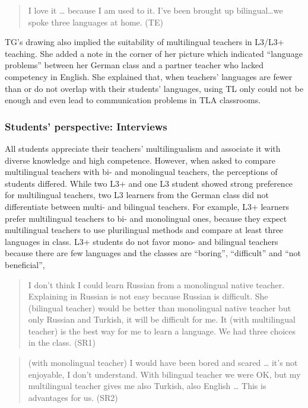 \documentclass[output=paper]{../langscibook}
\begin{document}
\begin{quote}
I love it … because I am used to it. I’ve been brought up bilingual…we spoke three languages at home. (TE) 
\end{quote}

TG’s drawing also implied the suitability of multilingual teachers in L3/L3+ teaching. She added a note in the corner of her picture which indicated “language problems” between her German class and a partner teacher who lacked competency in English. She explained that, when teachers’ languages are fewer than or do not overlap with their students’ languages, using TL only could not be enough and even lead to communication problems in TLA classrooms.


\subsubsection{Students’ perspective: Interviews}
All students appreciate their teachers’ multilingualism and associate it with diverse knowledge and high competence. However, when asked to compare multilingual teachers with bi- and monolingual teachers, the perceptions of students differed. While two L3+ and one L3 student showed strong preference for multilingual teachers, two L3 learners from the German class did not differentiate between multi- and bilingual teachers. For example, L3+ learners prefer multilingual teachers to bi- and monolingual ones, because they expect multilingual teachers to use plurilingual methods and compare at least three languages in class. L3+ students do not favor mono- and bilingual teachers because there are few languages and the classes are “boring”, “difficult” and “not beneficial”, 

\begin{quote}
I don’t think I could learn Russian from a monolingual native teacher. Explaining in Russian is not easy because Russian is difficult. She (bilingual teacher) would be better than monolingual native teacher but only Russian and Turkish, it will be difficult for me. It (with multilingual teacher) is the best way for me to learn a language. We had three choices in the class. (SR1)
\end{quote}

\begin{quote}
(with monolingual teacher) I would have been bored and scared … it’s not enjoyable, I don’t understand. With bilingual teacher we were OK, but my multilingual teacher gives me also Turkish, also English … This is advantages for us. (SR2)
\end{quote}
\end{document}
